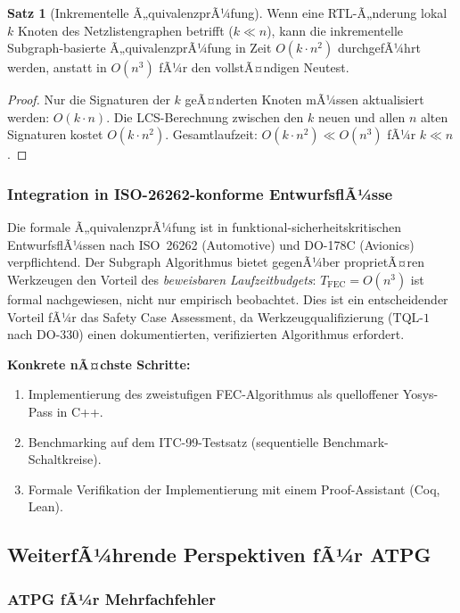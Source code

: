 ﻿\documentclass[a4paper,12pt]{article}
\theoremstyle{definition}
\newtheorem{satz}{Satz}
\begin{document}
\begin{satz}[Inkrementelle Ã„quivalenzprÃ¼fung]\label{satz:inkrementell_fec}
  Wenn eine RTL-Ã„nderung lokal $k$ Knoten des Netzlistengraphen betrifft
  ($k \ll n$), kann die inkrementelle Subgraph-basierte Ã„quivalenzprÃ¼fung in Zeit
  $O(k \cdot n^2)$ durchgefÃ¼hrt werden, anstatt in $O(n^3)$ fÃ¼r den vollstÃ¤ndigen
  Neutest.
\end{satz}

\begin{proof}
  Nur die Signaturen der $k$ geÃ¤nderten Knoten mÃ¼ssen aktualisiert werden: $O(k \cdot n)$.
  Die LCS-Berechnung zwischen den $k$ neuen und allen $n$ alten Signaturen kostet
  $O(k \cdot n^2)$. Gesamtlaufzeit: $O(k \cdot n^2) \ll O(n^3)$ fÃ¼r $k \ll n$.
\end{proof}

\subsubsection{Integration in ISO-26262-konforme EntwurfsflÃ¼sse}

Die formale Ã„quivalenzprÃ¼fung ist in funktional-sicherheitskritischen EntwurfsflÃ¼ssen
nach ISO~26262 (Automotive) und DO-178C (Avionics) verpflichtend. Der Subgraph
Algorithmus bietet gegenÃ¼ber proprietÃ¤ren Werkzeugen den Vorteil des
\emph{beweisbaren Laufzeitbudgets}: $T_{\text{FEC}} = O(n^3)$ ist formal nachgewiesen,
nicht nur empirisch beobachtet. Dies ist ein entscheidender Vorteil fÃ¼r das Safety Case
Assessment, da Werkzeugqualifizierung ($\text{TQL-1}$ nach DO-330) einen
dokumentierten, verifizierten Algorithmus erfordert.

\textbf{Konkrete nÃ¤chste Schritte:}
\begin{enumerate}
  \item Implementierung des zweistufigen FEC-Algorithmus als quelloffener
        Yosys-Pass \cite{wolf2013yosys} in C++.
  \item Benchmarking auf dem ITC-99-Testsatz (sequentielle Benchmark-Schaltkreise).
  \item Formale Verifikation der Implementierung mit einem Proof-Assistant (Coq, Lean).
\end{enumerate}

\subsection{WeiterfÃ¼hrende Perspektiven fÃ¼r ATPG}

\subsubsection{ATPG fÃ¼r Mehrfachfehler}
\end{document}
